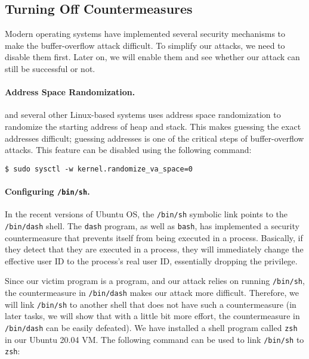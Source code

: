 \subsection{Turning Off Countermeasures}

Modern operating systems have implemented several
security mechanisms to make the buffer-overflow attack difficult. 
To simplify our attacks, we need to disable them first. 
Later on, we will enable them and 
see whether our attack can still be successful or not.


\paragraph{Address Space Randomization.}
\ubuntu and several other Linux-based systems uses address space
randomization to randomize the starting address of heap and
stack. This makes guessing the exact addresses difficult; guessing
addresses is one of the critical steps of buffer-overflow attacks.  
This feature can be disabled using the following command:

\begin{lstlisting}
$ sudo sysctl -w kernel.randomize_va_space=0
\end{lstlisting}


\paragraph{Configuring \texttt{/bin/sh}.} In the recent versions of 
Ubuntu OS, the \texttt{/bin/sh} symbolic link points to
the \texttt{/bin/dash} shell. The \texttt{dash} program, as well
as \texttt{bash},  has implemented a security countermeasure
that prevents itself from being executed in a \setuid process. 
Basically, if they detect that they are 
executed in a \setuid process, they will immediately 
change the effective user ID to the process's real user ID, essentially
dropping the privilege. 


Since our victim program is a \setuid program, and our 
attack relies on running \texttt{/bin/sh}, the countermeasure
in \texttt{/bin/dash} makes our attack more difficult. Therefore,
we will link \texttt{/bin/sh} to another shell that does not 
have such a countermeasure (in later tasks, we will show that with
a little bit more effort, the countermeasure in \texttt{/bin/dash}
can be easily defeated). We have installed a shell program 
called \texttt{zsh} in our Ubuntu 20.04 VM. The following
command can be used to link \texttt{/bin/sh} to \texttt{zsh}:

